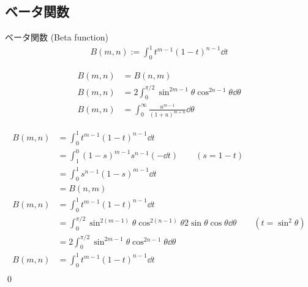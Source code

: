 \documentclass[uplatex,dvipdfmx,a4paper,11pt]{jlreq}
\makeatletter
\theoremstyle{definition}
\renewenvironment{proof}[1][\proofname]{\par
  \normalfont
  \topsep6\p@\@plus6\p@ \trivlist
  \item[\hskip\labelsep{\bfseries #1}\@addpunct{\bfseries}]\ignorespaces\quad\par
}{%
  \qed\endtrivlist\@endpefalse
}
\renewcommand\proofname{証明}
\makeatother
\begin{document}
\subsection{ベータ関数}
\begin{definition}
  ベータ関数 (Beta function)
  \begin{align}
    B(m, n) := \int_{0}^{1}t^{m-1}(1-t)^{n-1}\dd{t}
  \end{align}
\end{definition}

\begin{proposition}
  \begin{align}
    B(m, n) & = B(n, m)                                                          \\
    B(m, n) & = 2\int_0^{\pi/2}\sin^{2m - 1}\theta\cos^{2n - 1}\theta\dd{\theta} \\
    B(m, n) & = \int_0^{\infty}\frac{u^{m-1}}{(1 + u)^{m + n}}\dd{\theta}
  \end{align}
\end{proposition}
\begin{proof}
  \begin{align}
    B(m, n) & = \int_{0}^{1}t^{m-1}(1-t)^{n-1}\dd{t}                                                                             \\
            & = \int_{1}^{0}(1 - s)^{m-1}s^{n-1}(-\dd{t}) \qquad (s = 1 - t)                                                     \\
            & = \int_{0}^{1}s^{n-1}(1 - s)^{m-1}\dd{t}                                                                           \\
            & = B(n, m)                                                                                                          \\
    B(m, n) & = \int_{0}^{1}t^{m-1}(1-t)^{n-1}\dd{t}                                                                             \\
            & = \int_{0}^{\pi/2}\sin^{2(m-1)}\theta\cos^{2(n-1)}\theta2\sin\theta\cos\theta\dd{\theta} \qquad (t = \sin^2\theta) \\
            & = 2\int_0^{\pi/2}\sin^{2m - 1}\theta\cos^{2n - 1}\theta\dd{\theta}                                                 \\
    B(m, n) & = \int_{0}^{1}t^{m-1}(1-t)^{n-1}\dd{t}                                                                             \\
  \end{align}
\end{proof}
\end{document}

